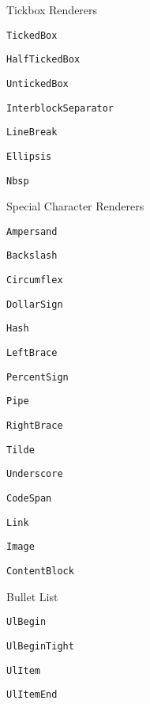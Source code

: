 \documentclass[
  digital,     %
  oneside,     %
  nosansbold,  %
  nocolorbold, %
  lof,         %
  lot,         %
]{fithesis4}
\begin{document}
\begin{figure}
  \centering
  \begin{multicols}{2}
    \footnotesize
    \begin{compactenum}
      \item Tickbox Renderers
      \begin{compactenum}
        \item \texttt{TickedBox}
        \item \texttt{HalfTickedBox}
        \item \texttt{UntickedBox}
      \end{compactenum}
      \item \texttt{InterblockSeparator}
      \item \texttt{LineBreak}
      \item \texttt{Ellipsis}
      \item \texttt{Nbsp}
      \item Special Character Renderers
      \begin{compactenum}
        \item \texttt{Ampersand}
        \item \texttt{Backslash}
        \item \texttt{Circumflex}
        \item \texttt{DollarSign}
        \item \texttt{Hash}
        \item \texttt{LeftBrace}
        \item \texttt{PercentSign}
        \item \texttt{Pipe}
        \item \texttt{RightBrace}
        \item \texttt{Tilde}
        \item \texttt{Underscore}
      \end{compactenum}
      \item \texttt{CodeSpan}
      \item \texttt{Link}
      \item \texttt{Image}
      \item \texttt{ContentBlock}
      \item Bullet List
      \begin{compactenum}
        \item \texttt{UlBegin}
        \item \texttt{UlBeginTight}
        \item \texttt{UlItem}
        \item \texttt{UlItemEnd}

\end{compactenum}
\end{compactenum}
\end{multicols}
\end{figure}
\end{document}
